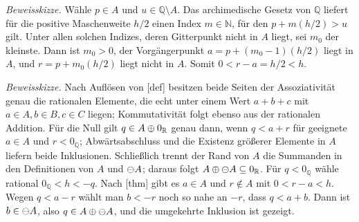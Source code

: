 \documentclass[main.tex]{subfiles}
\begin{document}

\emph{Beweisskizze.}
Wähle \(p\in A\) und \(u\in\mathbb Q\setminus A\). Das archimedische
Gesetz von \(\mathbb Q\) liefert für die positive Maschenweite \(h/2\) einen
Index \(m\in\mathbb N\), für den \(p+m(h/2)>u\) gilt. Unter allen solchen
Indizes, deren Gitterpunkt nicht in \(A\) liegt, sei \(m_0\) der kleinste.
Dann ist \(m_0>0\), der Vorgängerpunkt
\(a=p+(m_0-1)(h/2)\) liegt in \(A\), und
\(r=p+m_0(h/2)\) liegt nicht in \(A\). Somit
\(0<r-a=h/2<h\).


\emph{Beweisskizze.}
Nach Auflösen von [def] besitzen beide Seiten
der Assoziativität genau die rationalen Elemente, die echt unter einem Wert
\(a+b+c\) mit \(a\in A,b\in B,c\in C\) liegen; Kommutativität folgt ebenso
aus der rationalen Addition. Für die Null gilt
\(q\in A\mathbin{\oplus}0_{\mathbb R}\) genau dann, wenn \(q<a+r\) für geeignete
\(a\in A\) und \(r<0_{\mathbb Q}\); Abwärtsabschluss und die Existenz größerer
Elemente in \(A\) liefern beide Inklusionen. Schließlich trennt der Rand von
\(A\) die Summanden in den Definitionen von \(A\) und \(\mathop{\ominus}\!A\); daraus
folgt \(A\mathbin{\oplus}\mathop{\ominus}\!A\subseteq0_{\mathbb R}\). Für \(q<0_{\mathbb Q}\)
wähle rational \(0_{\mathbb Q}<h<-q\). Nach
[thm] gibt es
\(a\in A\) und \(r\notin A\) mit \(0<r-a<h\). Wegen \(q<a-r\) wählt man
\(b<-r\) noch so nahe an \(-r\), dass \(q<a+b\). Dann ist
\(b\in\mathop{\ominus}\!A\), also
\(q\in A\mathbin{\oplus}\mathop{\ominus}\!A\), und die umgekehrte Inklusion ist gezeigt.
\end{document}
